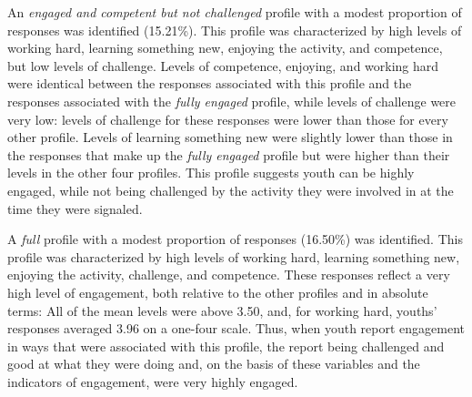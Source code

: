 \documentclass[]{msu-thesis}
\theoremstyle{definition}
\theoremstyle{definition}
\theoremstyle{definition}
\theoremstyle{remark}
\begin{document}
An \emph{engaged and competent but not challenged} profile with a modest
proportion of responses was identified (15.21\%). This profile was
characterized by high levels of working hard, learning something new,
enjoying the activity, and competence, but low levels of challenge.
Levels of competence, enjoying, and working hard were identical between
the responses associated with this profile and the responses associated
with the \emph{fully engaged} profile, while levels of challenge were
very low: levels of challenge for these responses were lower than those
for every other profile. Levels of learning something new were slightly
lower than those in the responses that make up the \emph{fully engaged}
profile but were higher than their levels in the other four profiles.
This profile suggests youth can be highly engaged, while not being
challenged by the activity they were involved in at the time they were
signaled.

A \emph{full} profile with a modest proportion of responses (16.50\%)
was identified. This profile was characterized by high levels of working
hard, learning something new, enjoying the activity, challenge, and
competence. These responses reflect a very high level of engagement,
both relative to the other profiles and in absolute terms: All of the
mean levels were above 3.50, and, for working hard, youths' responses
averaged 3.96 on a one-four scale. Thus, when youth report engagement in
ways that were associated with this profile, the report being challenged
and good at what they were doing and, on the basis of these variables
and the indicators of engagement, were very highly engaged.

\begin{landscape}\begin{table}

\caption{\label{tab:unnamed-chunk-14}Raw variables values by profile}
\centering
{}
\end{table}
\end{landscape}
\end{document}
